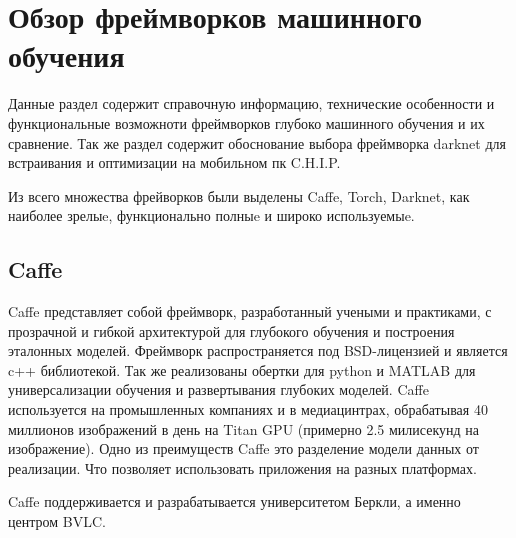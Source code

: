 \documentclass[a4paper,english,russian]{G2-105}
\begin{document}
\chapter{Обзор фреймворков машинного обучения}
\par Данные раздел содержит справочную информацию, технические особенности и функциональные возможноти фреймворков глубоко машинного обучения и их сравнение. Так же раздел содержит обоснование выбора фреймворка darknet для встраивания и оптимизации на мобильном пк C.H.I.P.
\par Из всего множества фрейворков были выделены Caffe, Torch, Darknet, как наиболее зрелыe, функционально полныe и широко используемыe.
\section{Caffe}
\par Caffe представляет собой фреймворк, разработанный учеными и практиками, с прозрачной и гибкой архитектурой для глубокого обучения и построения эталонных моделей. Фреймворк распространяется под BSD-лицензией и является c++ библиотекой. Так же реализованы обертки для python и MATLAB для универсализации обучения и развертывания глубоких моделей. Caffe используется на промышленных компаниях и в медиацинтрах, обрабатывая 40 миллионов изображений в день на Titan GPU (примерно 2.5 милисекунд на изображение). Одно из преимуществ Caffe это разделение модели данных от реализации. Что позволяет использовать приложения на разных платформах.
\par Caffe поддерживается и разрабатывается университетом Беркли, а именно центром BVLC.
\end{document}
